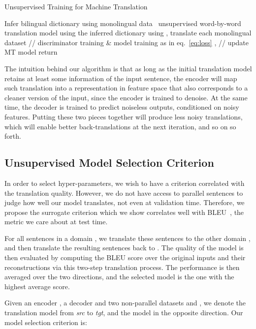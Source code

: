 \documentclass{article} \usepackage{iclr2018_conference,times}
\begin{document}
\begin{algorithm}[t] 
\caption{Unsupervised Training for Machine Translation}
\begin{algorithmic}[1]
\State Infer bilingual dictionary using monolingual data~\citep{wordalign17}
\State  unsupervised word-by-word translation model using the inferred dictionary
\For{}
\State using , translate each monolingual dataset 
\State // discriminator training \& model training as in eq.~\ref{eq:loss}
\State , \hspace{.2cm} 
\State   // update MT model
\EndFor
\State return 
\EndProcedure
\end{algorithmic}
\label{algo:main_algo}
\end{algorithm}

The intuition behind our algorithm is that as long as the initial translation model  retains at least some information of the input sentence, the encoder will map such translation into a representation in feature space that also corresponds to a cleaner version of the input, since the encoder is  trained to denoise. At the same time, the decoder is trained to predict noiseless outputs, conditioned on noisy features. Putting these two pieces together will produce less noisy translations, which will enable better back-translations at the next iteration, and so on so forth. 

\subsection{Unsupervised Model Selection Criterion}
\label{sec:unsupervised_criterion}

In order to select hyper-parameters, we wish to have a criterion correlated with the translation quality. However, we do not have access to parallel sentences to judge how well our model translates, not even at validation time. Therefore, we propose the surrogate criterion which we show correlates well with BLEU~\citep{bleu}, the metric we care about at test time.

For all sentences  in a domain , we translate these sentences to the other domain , and then translate the resulting sentences back to . The quality of the model is then evaluated by computing the BLEU score over the original inputs and their reconstructions via this two-step translation process. The performance is then averaged over the two directions, and the selected model is the one with the highest average score. 

Given an encoder , a decoder  and two non-parallel datasets  and , we denote  the translation model from \textit{src} to \textit{tgt}, and  the model in the opposite direction. Our model selection criterion   is:
\end{document}
